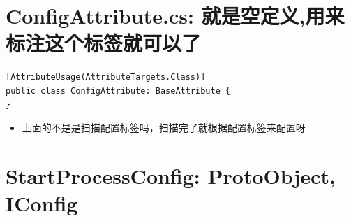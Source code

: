 \documentclass[9pt, b5paper]{article}
\begin{document}
\section{ConfigAttribute.cs: 就是空定义,用来标注这个标签就可以了}
\label{sec-17}
\begin{verbatim}
[AttributeUsage(AttributeTargets.Class)]
public class ConfigAttribute: BaseAttribute {
}
\end{verbatim}
\begin{itemize}
\item 上面的不是是扫描配置标签吗，扫描完了就根据配置标签来配置呀
\end{itemize}
\section{StartProcessConfig: ProtoObject, IConfig}
\label{sec-18}
\end{document}
